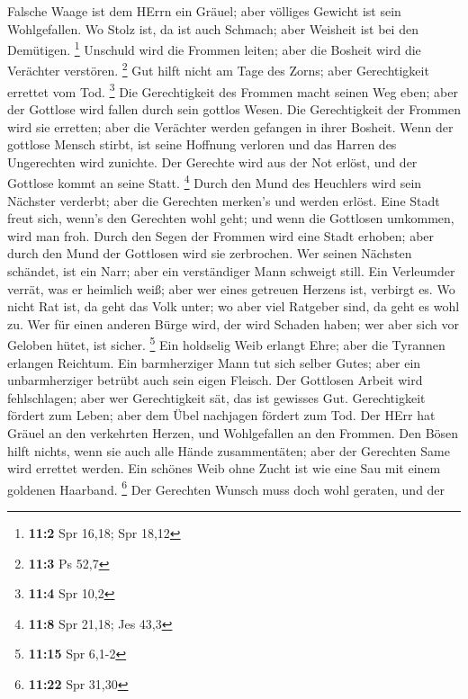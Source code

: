  Falsche Waage ist dem HErrn ein Gräuel; aber völliges
Gewicht ist sein Wohlgefallen.  Wo Stolz ist, da ist auch
Schmach; aber Weisheit ist bei den Demütigen. \footnote{\textbf{11:2}
  Spr 16,18; Spr 18,12}  Unschuld wird die Frommen leiten;
aber die Bosheit wird die Verächter verstören. \footnote{\textbf{11:3}
  Ps 52,7}  Gut hilft nicht am Tage des Zorns; aber
Gerechtigkeit errettet vom Tod. \footnote{\textbf{11:4} Spr 10,2}
 Die Gerechtigkeit des Frommen macht seinen Weg eben; aber
der Gottlose wird fallen durch sein gottlos Wesen.  Die
Gerechtigkeit der Frommen wird sie erretten; aber die Verächter werden
gefangen in ihrer Bosheit.  Wenn der gottlose Mensch
stirbt, ist seine Hoffnung verloren und das Harren des Ungerechten wird
zunichte.  Der Gerechte wird aus der Not erlöst, und der
Gottlose kommt an seine Statt. \footnote{\textbf{11:8} Spr 21,18; Jes
  43,3}  Durch den Mund des Heuchlers wird sein Nächster
verderbt; aber die Gerechten merken's und werden erlöst. 
Eine Stadt freut sich, wenn's den Gerechten wohl geht; und wenn die
Gottlosen umkommen, wird man froh.  Durch den Segen der
Frommen wird eine Stadt erhoben; aber durch den Mund der Gottlosen wird
sie zerbrochen.  Wer seinen Nächsten schändet, ist ein
Narr; aber ein verständiger Mann schweigt still.  Ein
Verleumder verrät, was er heimlich weiß; aber wer eines getreuen Herzens
ist, verbirgt es.  Wo nicht Rat ist, da geht das Volk
unter; wo aber viel Ratgeber sind, da geht es wohl zu. 
Wer für einen anderen Bürge wird, der wird Schaden haben; wer aber sich
vor Geloben hütet, ist sicher. \footnote{\textbf{11:15} Spr 6,1-2}
 Ein holdselig Weib erlangt Ehre; aber die Tyrannen
erlangen Reichtum.  Ein barmherziger Mann tut sich selber
Gutes; aber ein unbarmherziger betrübt auch sein eigen Fleisch.
 Der Gottlosen Arbeit wird fehlschlagen; aber wer
Gerechtigkeit sät, das ist gewisses Gut.  Gerechtigkeit
fördert zum Leben; aber dem Übel nachjagen fördert zum Tod.
 Der HErr hat Gräuel an den verkehrten Herzen, und
Wohlgefallen an den Frommen.  Den Bösen hilft nichts,
wenn sie auch alle Hände zusammentäten; aber der Gerechten Same wird
errettet werden.  Ein schönes Weib ohne Zucht ist wie
eine Sau mit einem goldenen Haarband. \footnote{\textbf{11:22} Spr 31,30}
 Der Gerechten Wunsch muss doch wohl geraten, und der

